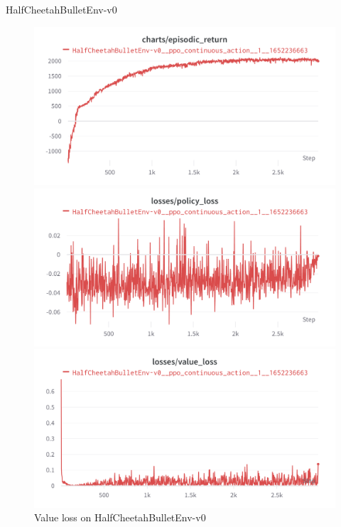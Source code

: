 \documentclass[english, xcolor=dvipsnames, aspectratio=169]{beamer}
\begin{document}
\begin{frame}{HalfCheetahBulletEnv-v0}
    \begin{figure}[ht]
        \begin{minipage}[b]{0.32\linewidth}
            \centering
            \includegraphics[width=\textwidth]{half_.png}
            \caption{Reward on HalfCheetahBulletEnv-v0}
            \label{fig:cifar10}
        \end{minipage}
        \hspace{0.5cm}
        \begin{minipage}[b]{0.32\linewidth}
            \centering
            \includegraphics[width=\textwidth]{half_policy_loss.png}
            \caption{Policy loss on HalfCheetahBulletEnv-v0}
            \label{fig:cifar100}
        \end{minipage}
        \begin{minipage}[b]{0.32\linewidth}
            \centering
            \includegraphics[width=\textwidth]{half_value_loss.png}
            \caption{Value loss on HalfCheetahBulletEnv-v0}
            \label{fig:imagenet1k}
        \end{minipage}
    \end{figure}



\end{frame}
\end{document}
